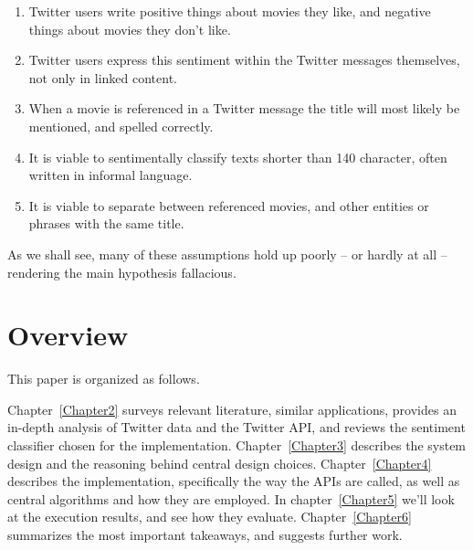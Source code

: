 \begin{enumerate}
  \item Twitter users write positive things about movies they like, and negative things about movies they don't like.
  \item Twitter users express this sentiment within the Twitter messages themselves, not only in linked content.
  \item When a movie is referenced in a Twitter message the title will most likely be mentioned, and spelled correctly.
  \item It is viable to sentimentally classify texts shorter than 140 character, often written in informal language.
  \item It is viable to separate between referenced movies, and other entities or phrases with the same title.
\end{enumerate}

As we shall see, many of these assumptions hold up poorly -- or hardly at all -- rendering the main hypothesis fallacious.


\section{Overview}

This paper is organized as follows.

Chapter~\ref{Chapter2} surveys relevant literature, similar applications, provides an in-depth analysis of Twitter data and the Twitter API, and reviews the sentiment classifier chosen for the implementation.
Chapter~\ref{Chapter3} describes the system design and the reasoning behind central design choices.
Chapter~\ref{Chapter4} describes the implementation, specifically the way the APIs are called, as well as central algorithms and how they are employed.
In chapter~\ref{Chapter5} we'll look at the execution results, and see how they evaluate.
Chapter~\ref{Chapter6} summarizes the most important takeaways, and suggests further work.

